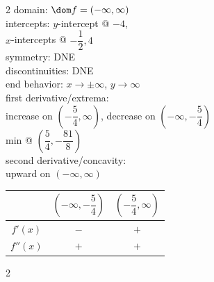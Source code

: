 \documentclass{book}
\begin{document}
\begin{appendices}
\begin{enumerate}[!HW!]
\begin{multicols}{2}
domain: $\dom f = (-\infty,\infty)$\\
intercepts: $y$-intercept @ $-4$,\\ $x$-intercepts @ $-\dfrac{1}{2},4$\\
symmetry: DNE\\ 
discontinuities: DNE\\
end behavior: $x\to\pm\infty$, $y\to\infty$\\
first derivative/extrema:\\ increase on $\left(-\dfrac{5}{4},\infty\right)$, decrease on $\left(-\infty,-\dfrac{5}{4}\right)$\\ min @ $\left(\dfrac{5}{4},-\dfrac{81}{8}\right)$ \\
second derivative/concavity:\\ upward on $(-\infty,\infty)$\vspace{-15pt}
\begin{center}
\begin{tabular}{c|c|c}
 & $\left(-\infty,-\dfrac{5}{4}\right)$ & $\left(-\dfrac{5}{4},\infty\right)$  \\ \hline
$f'(x)$ & $-$ & $+$ \\ 
$f''(x)$ & $+$ & $+$ \\ 
\end{tabular}
\end{center} 
\end{multicols}

\itemspade \mbox{}\vspace{-25pt}

\begin{multicols}{2}
\columnbreak


\end{multicols}
\end{enumerate}
\end{appendices}
\end{document}
